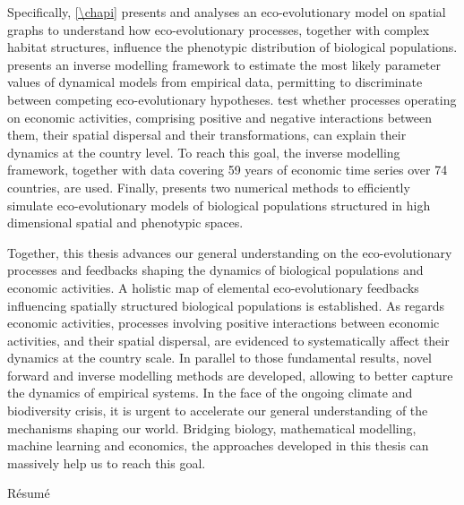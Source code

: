 {Specifically, \cref{\chapi} presents and analyses an eco-evolutionary model on spatial graphs to understand how eco-evolutionary processes, together with complex habitat structures, influence the phenotypic distribution of biological populations. \Cref{\chapii} presents an inverse modelling framework to estimate the most likely parameter values of dynamical models from empirical data, permitting to discriminate between competing eco-evolutionary hypotheses. \Cref{\chapiv} test whether processes operating on economic activities, comprising positive and negative interactions between them, their spatial dispersal and their transformations, can explain their dynamics at the country level. To reach this goal, the inverse modelling framework, together with data covering 59 years of economic time series over 74 countries, are used. Finally, \Cref{\chapiv} presents two numerical methods to efficiently simulate eco-evolutionary models of biological populations structured in high dimensional spatial and phenotypic spaces.

Together, this thesis advances our general understanding on the eco-evolutionary processes and feedbacks shaping the dynamics of biological populations and economic activities. A holistic map of elemental eco-evolutionary feedbacks influencing spatially structured biological populations is established. As regards economic activities, processes involving positive interactions between economic activities, and their spatial dispersal, are evidenced to systematically affect their dynamics at the country scale.
% 
In parallel to those fundamental results, novel forward and inverse modelling methods are developed, allowing to better capture the dynamics of empirical systems.
% 
In the face of the ongoing climate and biodiversity crisis, it is urgent to accelerate our general understanding of the mechanisms shaping our world.
% 
Bridging biology, mathematical modelling, machine learning and economics, the approaches developed in this thesis can massively help us to reach this goal.
}

\vspace*{20mm}

{Résumé}
\label{sec:summary-fr}
\vspace*{15mm}

